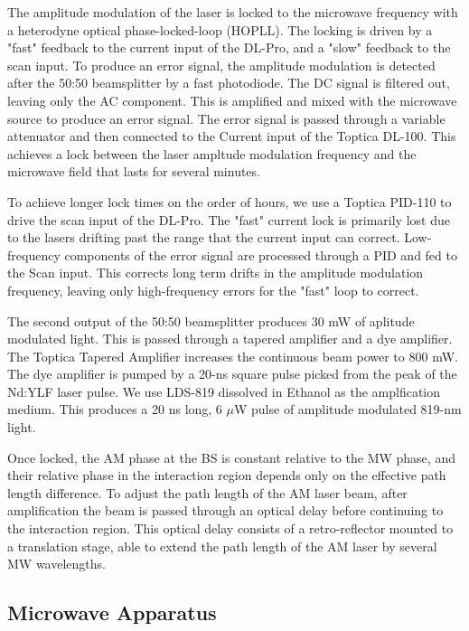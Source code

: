 \documentclass[aps,pra,preprint,groupedaddress]{revtex4-1}
\begin{document}
The amplitude modulation of the laser is locked to the microwave frequency with a heterodyne optical phase-locked-loop (HOPLL). The locking is driven by a "fast" feedback to the current input of the DL-Pro, and a "slow" feedback to the scan input. To produce an error signal, the amplitude modulation is detected after the 50:50 beamsplitter by a fast photodiode. The DC signal is filtered out, leaving only the AC component. This is amplified and mixed with the microwave source to produce an error signal. The error signal is passed through a variable attenuator and then connected to the Current input of the Toptica DL-100. This achieves a lock between the laser ampltude modulation frequency and the microwave field that lasts for several minutes.

To achieve longer lock times on the order of hours, we use a Toptica PID-110 to drive the scan input of the DL-Pro. The "fast" current lock is primarily lost due to the lasers drifting past the range that the current input can correct. Low-frequency components of the error signal are processed through a PID and fed to the Scan input. This corrects long term drifts in the amplitude modulation frequency, leaving only high-frequency errors for the "fast" loop to correct.

The second output of the 50:50 beamsplitter produces 30 mW of aplitude modulated light. This is passed through a tapered amplifier and a dye amplifier. The Toptica Tapered Amplifier increases the continuous beam power to 800 mW. The dye amplifier is pumped by a 20-ns square pulse picked from the peak of the Nd:YLF laser pulse. We use LDS-819 dissolved in Ethanol as the amplfication medium. This produces a 20 ns long, 6 $\mu$W pulse of amplitude modulated 819-nm light.

Once locked, the AM phase at the BS is constant relative to the MW phase, and their relative phase in the interaction region depends only on the effective path length difference. To adjust the path length of the AM laser beam, after amplification the beam is passed through an optical delay before continuing to the interaction region. This optical delay consists of a retro-reflector mounted to a translation stage, able to extend the path length of the AM laser by several MW wavelengths.

\subsection{\label{cavity} Microwave Apparatus}
\end{document}
